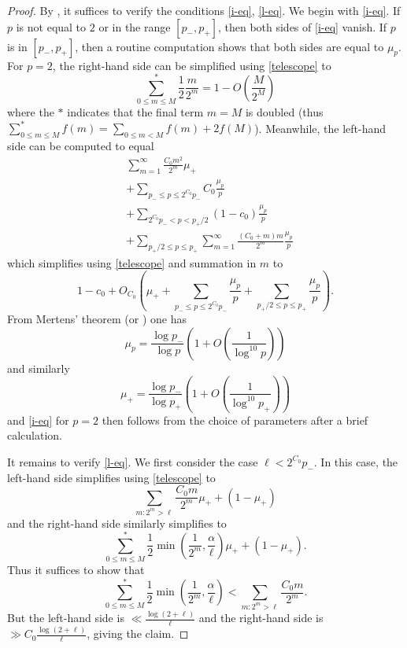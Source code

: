\documentclass[12pt,a4paper,reqno]{amsart}
\numberwithin{equation}{section}
\theoremstyle{plain}
\theoremstyle{definition}
\begin{document}
\begin{proof}
By , it suffices to verify the conditions \eqref{i-eq}, \eqref{l-eq}.  We begin with \eqref{i-eq}.  If $p$ is not equal to $2$ or in the range $[p_-,p_+]$, then both sides of \eqref{i-eq} vanish.  If $p$ is in $[p_-,p_+]$, then a routine computation shows that both sides are equal to $\mu_p$.  For $p=2$, the right-hand side can be simplified using \eqref{telescope} to
$$ \sum_{0 \leq m \leq M}^* \frac{1}{2} \frac{m}{2^m} = 1 - O\left( \frac{M}{2^M} \right)$$
where the $*$ indicates that the final term $m=M$ is doubled (thus $\sum_{0 \leq m \leq M}^* f(m) = \sum_{0 \leq m<M} f(m) + 2 f(M)$).  Meanwhile, the left-hand side can be computed to equal
\begin{align*}
  &\sum_{m=1}^\infty \frac{C_0 m^2}{2^m} \mu_+ \\
  & + \sum_{p_- \leq p \leq 2^{C_0} p_-} C_0 \frac{\mu_p}{p} \\
  & + \sum_{2^{C_0} p_- < p < p_+/2} (1-c_0) \frac{\mu_p}{p} \\
  & + \sum_{p_+/2 \leq p \leq p_+} \sum_{m=1}^\infty \frac{(C_0+m) m}{2^m} \frac{\mu_p}{p}
\end{align*}
which simplifies using \eqref{telescope} and summation in $m$ to
$$ 1 - c_0 + O_{C_0}\left( \mu_+ + \sum_{p_- \leq p \leq 2^{C_0} p_-} \frac{\mu_p}{p} + \sum_{p_+/2 \leq p \leq p_+} \frac{\mu_p}{p}\right).$$
From Mertens' theorem (or ) one has
\begin{equation}\label{mertens}
  \mu_p = \frac{\log p_-}{\log p} \left( 1 + O\left( \frac{1}{\log^{10} p} \right) \right)
\end{equation}
and similarly
\begin{equation}\label{mertens-2}
  \mu_+ = \frac{\log p_-}{\log p_+} \left( 1 + O\left( \frac{1}{\log^{10} p_+} \right) \right)
\end{equation}
and \eqref{i-eq} for $p=2$ then follows from the choice of parameters after a brief calculation.

It remains to verify \eqref{l-eq}.  We first consider the case $\ell < 2^{C_0} p_-$.  In this case, the left-hand side simplifies using \eqref{telescope} to
$$ \sum_{m: 2^m > \ell} \frac{C_0 m}{2^m} \mu_+ + (1-\mu_+)$$
and the right-hand side similarly simplifies to
$$ \sum_{0 \leq m \leq M}^* \frac{1}{2} \min\left( \frac{1}{2^m}, \frac{\alpha}{\ell}\right) \mu_+ + (1-\mu_+).$$
Thus it suffices to show that
\begin{equation}\label{lint} \sum_{0 \leq m \leq M}^* \frac{1}{2} \min( \frac{1}{2^m}, \frac{\alpha}{\ell}) < \sum_{m: 2^m > \ell} \frac{C_0 m}{2^m}.
\end{equation}
But the left-hand side is $\ll \frac{\log (2+\ell)}{\ell}$ and the right-hand side is $\gg C_0 \frac{\log (2+\ell)}{\ell}$, giving the claim.


\end{proof}
\end{document}
